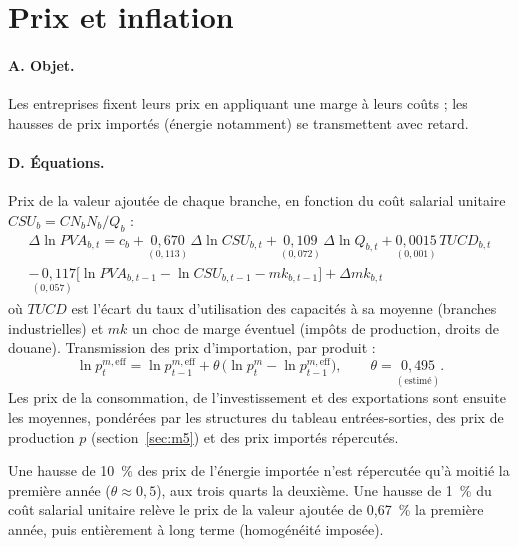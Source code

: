 \section{Prix et inflation}
\label{sec:prix}

\paragraph{A. Objet.} Les entreprises fixent leurs prix en appliquant une marge à leurs coûts ; les hausses de prix
importés (énergie notamment) se transmettent avec retard.

\paragraph{D. Équations.} Prix de la valeur ajoutée de chaque branche, en fonction du coût salarial unitaire
$CSU_b = CN_b N_b / Q_b$ :
\begin{multline}
\Delta\ln PVA_{b,t} = c_b + \underset{(0{,}113)}{0{,}670}\,\Delta\ln CSU_{b,t} + \underset{(0{,}072)}{0{,}109}\,\Delta\ln Q_{b,t}
+ \underset{(0{,}001)}{0{,}0015}\,TUCD_{b,t} \\ \underset{(0{,}057)}{-\,0{,}117}\bigl[\ln PVA_{b,t-1} - \ln CSU_{b,t-1} - mk_{b,t-1}\bigr] + \Delta mk_{b,t}
\end{multline}
où $TUCD$ est l'écart du taux d'utilisation des capacités à sa moyenne (branches industrielles) et $mk$ un choc de
marge éventuel (impôts de production, droits de douane). Transmission des prix d'importation, par produit :
\begin{equation}
\ln p^{m,\text{eff}}_t = \ln p^{m,\text{eff}}_{t-1} + \theta\,\bigl(\ln p^m_t - \ln p^{m,\text{eff}}_{t-1}\bigr),\qquad \theta = \underset{(\text{estimé})}{0{,}495}.
\end{equation}
Les prix de la consommation, de l'investissement et des exportations sont ensuite les moyennes, pondérées par les
structures du tableau entrées-sorties, des prix de production $p$ (section~\ref{sec:m5}) et des prix importés
répercutés.

\begin{exemple}
Une hausse de 10~\% des prix de l'énergie importée n'est répercutée qu'à moitié la première année ($\theta \approx 0{,}5$),
aux trois quarts la deuxième. Une hausse de 1~\% du coût salarial unitaire relève le prix de la valeur ajoutée de
0,67~\% la première année, puis entièrement à long terme (homogénéité imposée).
\end{exemple}

